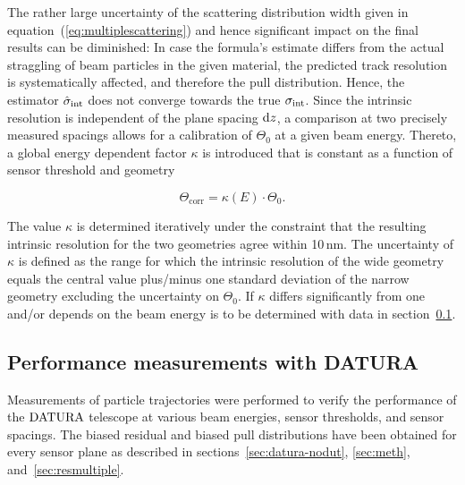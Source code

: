The rather large uncertainty of the scattering distribution width given in equation~(\ref{eq:multiplescattering}) and hence significant impact on the final results can be diminished: 
In case the formula's estimate differs from the actual straggling of beam particles in the given material, the predicted track resolution is systematically affected, and therefore the pull distribution. 
Hence, the estimator $\hat{\sigma}_{\textrm{int}}$ does not converge towards the true $\sigma_{\textrm{int}}$. 
Since the intrinsic resolution is independent of the plane spacing $\textrm{d}z$, a comparison at two precisely measured spacings allows for a calibration of $\Theta_0$ at a given beam energy. 
Thereto, a global energy dependent factor $\kappa$ is introduced that is constant as a function of sensor threshold and geometry

\begin{equation}
 \Theta_{\textrm{corr}} = \kappa(E) \cdot \Theta_0.
 \label{eq:thetacorr}
\end{equation}

\noindent
The value $\kappa$ is determined iteratively under the constraint that the resulting intrinsic resolution for the two geometries agree within 10\,nm.
The uncertainty of $\kappa$ is defined as the range for which the intrinsic resolution of the wide geometry equals the central value plus/minus one standard deviation of the narrow geometry
 excluding the uncertainty on $\Theta_0$. 
If $\kappa$ differs significantly from one and/or depends on the beam energy is to be determined with data in section~\ref{sec:measurements}. 


\subsection{Performance measurements with DATURA}
\label{sec:measurements}

Measurements of particle trajectories were performed to verify the performance of the $\textrm{DATURA}$ telescope at various beam energies, sensor thresholds, and sensor spacings. %
The biased residual and biased pull distributions have been obtained for every sensor plane as described in sections~\ref{sec:datura-nodut}, \ref{sec:meth}, and~\ref{sec:resmultiple}. 
% 

